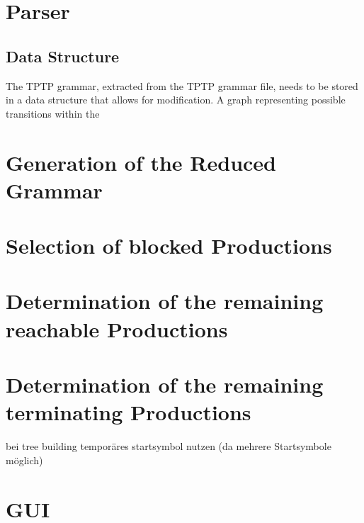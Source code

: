 \section{Parser}
\subsection{Data Structure}
The \ac{TPTP} grammar, extracted from the \ac{TPTP} grammar file, needs to be stored in a data structure that allows for modification. A graph representing
possible transitions within the 
\section{Generation of the Reduced Grammar}\label{sec:ConceptGenerateReducedGrammar}

\section{Selection of blocked Productions}

\section{Determination of the remaining reachable Productions}

\section{Determination of  the remaining terminating Productions}


bei tree building temporäres startsymbol nutzen (da mehrere Startsymbole möglich)

\section{GUI}\label{sec:ConceptGUI}


